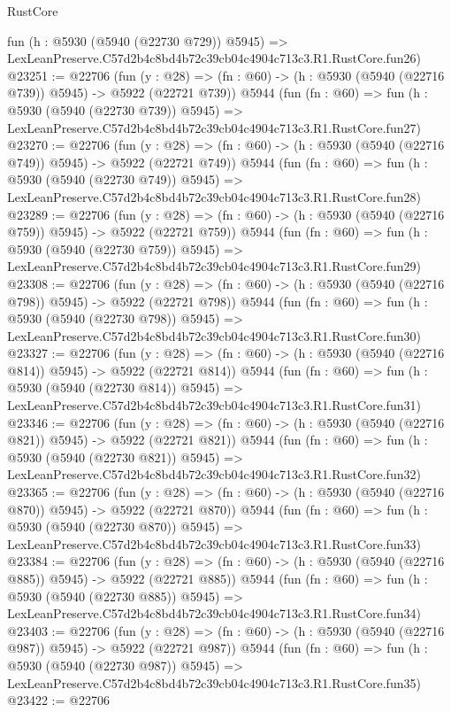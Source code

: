\begin{lexlean}{RustCore}
\begin{coremodule}
    fun (h : @5930 (@5940 (@22730 @729)) @5945) =>
    LexLeanPreserve.C57d2b4c8bd4b72c39cb04c4904c713c3.R1.RustCore.fun26)
@23251 := @22706
    (fun (y : @28) => (fn : @60) -> (h : @5930 (@5940 (@22716 @739)) @5945) -> @5922 (@22721 @739))
    @5944
    (fun (fn : @60) =>
    fun (h : @5930 (@5940 (@22730 @739)) @5945) =>
    LexLeanPreserve.C57d2b4c8bd4b72c39cb04c4904c713c3.R1.RustCore.fun27)
@23270 := @22706
    (fun (y : @28) => (fn : @60) -> (h : @5930 (@5940 (@22716 @749)) @5945) -> @5922 (@22721 @749))
    @5944
    (fun (fn : @60) =>
    fun (h : @5930 (@5940 (@22730 @749)) @5945) =>
    LexLeanPreserve.C57d2b4c8bd4b72c39cb04c4904c713c3.R1.RustCore.fun28)
@23289 := @22706
    (fun (y : @28) => (fn : @60) -> (h : @5930 (@5940 (@22716 @759)) @5945) -> @5922 (@22721 @759))
    @5944
    (fun (fn : @60) =>
    fun (h : @5930 (@5940 (@22730 @759)) @5945) =>
    LexLeanPreserve.C57d2b4c8bd4b72c39cb04c4904c713c3.R1.RustCore.fun29)
@23308 := @22706
    (fun (y : @28) => (fn : @60) -> (h : @5930 (@5940 (@22716 @798)) @5945) -> @5922 (@22721 @798))
    @5944
    (fun (fn : @60) =>
    fun (h : @5930 (@5940 (@22730 @798)) @5945) =>
    LexLeanPreserve.C57d2b4c8bd4b72c39cb04c4904c713c3.R1.RustCore.fun30)
@23327 := @22706
    (fun (y : @28) => (fn : @60) -> (h : @5930 (@5940 (@22716 @814)) @5945) -> @5922 (@22721 @814))
    @5944
    (fun (fn : @60) =>
    fun (h : @5930 (@5940 (@22730 @814)) @5945) =>
    LexLeanPreserve.C57d2b4c8bd4b72c39cb04c4904c713c3.R1.RustCore.fun31)
@23346 := @22706
    (fun (y : @28) => (fn : @60) -> (h : @5930 (@5940 (@22716 @821)) @5945) -> @5922 (@22721 @821))
    @5944
    (fun (fn : @60) =>
    fun (h : @5930 (@5940 (@22730 @821)) @5945) =>
    LexLeanPreserve.C57d2b4c8bd4b72c39cb04c4904c713c3.R1.RustCore.fun32)
@23365 := @22706
    (fun (y : @28) => (fn : @60) -> (h : @5930 (@5940 (@22716 @870)) @5945) -> @5922 (@22721 @870))
    @5944
    (fun (fn : @60) =>
    fun (h : @5930 (@5940 (@22730 @870)) @5945) =>
    LexLeanPreserve.C57d2b4c8bd4b72c39cb04c4904c713c3.R1.RustCore.fun33)
@23384 := @22706
    (fun (y : @28) => (fn : @60) -> (h : @5930 (@5940 (@22716 @885)) @5945) -> @5922 (@22721 @885))
    @5944
    (fun (fn : @60) =>
    fun (h : @5930 (@5940 (@22730 @885)) @5945) =>
    LexLeanPreserve.C57d2b4c8bd4b72c39cb04c4904c713c3.R1.RustCore.fun34)
@23403 := @22706
    (fun (y : @28) => (fn : @60) -> (h : @5930 (@5940 (@22716 @987)) @5945) -> @5922 (@22721 @987))
    @5944
    (fun (fn : @60) =>
    fun (h : @5930 (@5940 (@22730 @987)) @5945) =>
    LexLeanPreserve.C57d2b4c8bd4b72c39cb04c4904c713c3.R1.RustCore.fun35)
@23422 := @22706

\end{coremodule}
\end{lexlean}

